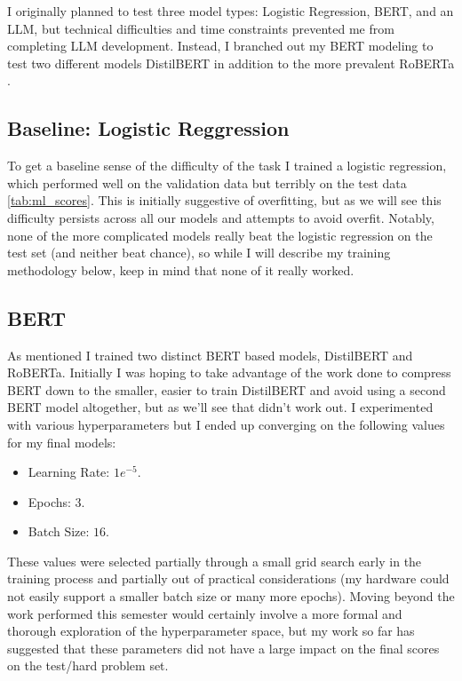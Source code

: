 \documentclass[11pt,a4paper]{article}
\begin{document}
I originally planned to test three model types: Logistic Regression, BERT, and an LLM, but technical difficulties and time constraints prevented me from completing LLM development. Instead, I branched out my BERT modeling to test two different models DistilBERT \cite{DBLP:journals/corr/abs-1910-01108} in addition to the more prevalent RoBERTa \cite{liu2019roberta}.

\subsection{Baseline: Logistic Reggression}

To get a baseline sense of the difficulty of the task I trained a logistic regression, which performed well on the validation data but terribly on the test data \ref{tab:ml_scores}. This is initially suggestive of overfitting, but as we will see this difficulty persists across all our models and attempts to avoid overfit. Notably, none of the more complicated models really beat the logistic regression on the test set (and neither beat chance), so while I will describe my training methodology below, keep in mind that none of it really worked.

\subsection{BERT}

As mentioned I trained two distinct BERT based models, DistilBERT and RoBERTa. Initially I was hoping to take advantage of the work done to compress BERT down to the smaller, easier to train DistilBERT and avoid using a second BERT model altogether, but as we'll see that didn't work out. I experimented with various hyperparameters but I ended up converging on the following values for my final models:

\begin{itemize}
    \item Learning Rate: $1e^{-5}$.
    \item Epochs: $3$.
    \item Batch Size: $16$.
\end{itemize}

These values were selected partially through a small grid search early in the training process and partially out of practical considerations (my hardware could not easily support a smaller batch size or many more epochs). Moving beyond the work performed this semester would certainly involve a more formal and thorough exploration of the hyperparameter space, but my work so far has suggested that these parameters did not have a large impact on the final scores on the test/hard problem set.
\end{document}
